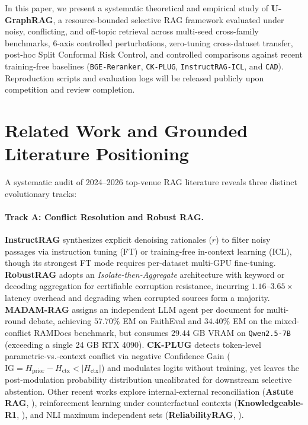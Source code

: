 \documentclass[11pt]{article}
\begin{document}
In this paper, we present a systematic theoretical and empirical study of \textbf{U-GraphRAG}, a resource-bounded selective RAG framework evaluated under noisy, conflicting, and off-topic retrieval across multi-seed cross-family benchmarks, 6-axis controlled perturbations, zero-tuning cross-dataset transfer, post-hoc Split Conformal Risk Control, and controlled comparisons against recent training-free baselines (\texttt{BGE-Reranker}, \texttt{CK-PLUG}, \texttt{InstructRAG-ICL}, and \texttt{CAD}). Reproduction scripts and evaluation logs will be released publicly upon competition and review completion.

\section{Related Work and Grounded Literature Positioning}

A systematic audit of 2024--2026 top-venue RAG literature reveals three distinct evolutionary tracks:

\paragraph{Track A: Conflict Resolution and Robust RAG.}
\textbf{InstructRAG} \cite{wei2025instructrag} synthesizes explicit denoising rationales ($r$) to filter noisy passages via instruction tuning (FT) or training-free in-context learning (ICL), though its strongest FT mode requires per-dataset multi-GPU fine-tuning. \textbf{RobustRAG} \cite{xiang2024robustrag} adopts an \emph{Isolate-then-Aggregate} architecture with keyword or decoding aggregation for certifiable corruption resistance, incurring $1.16\text{--}3.65\times$ latency overhead and degrading when corrupted sources form a majority. \textbf{MADAM-RAG} \cite{wang2025madamrag} assigns an independent LLM agent per document for multi-round debate, achieving $57.70\%$ EM on FaithEval and $34.40\%$ EM on the mixed-conflict RAMDocs benchmark, but consumes $29.44\text{ GB}$ VRAM on \texttt{Qwen2.5-7B} (exceeding a single 24 GB RTX 4090). \textbf{CK-PLUG} \cite{bi2026ckplug} detects token-level parametric-vs.-context conflict via negative Confidence Gain ($\text{IG} = H_{\text{prior}} - H_{\text{ctx}} < |H_{\text{ctx}}|$) and modulates logits without training, yet leaves the post-modulation probability distribution uncalibrated for downstream selective abstention. Other recent works explore internal-external reconciliation (\textbf{Astute RAG}, \citealp{wang2025astuterag}), reinforcement learning under counterfactual contexts (\textbf{Knowledgeable-R1}, \citealp{knowledgeabler1_2026}), and NLI maximum independent sets (\textbf{ReliabilityRAG}, \citealp{reliabilityrag2025}).
\end{document}
